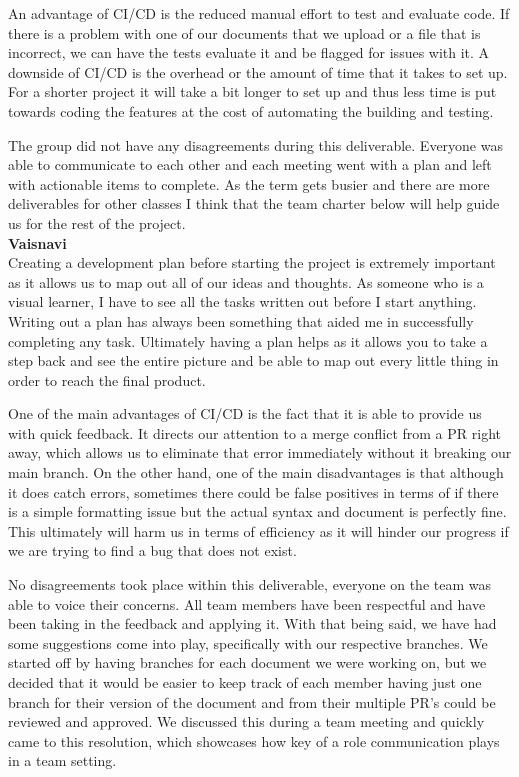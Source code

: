 \documentclass{article}
\begin{document}
An advantage of CI/CD is the reduced manual effort to test and evaluate code. If there is a problem with one of our documents that we upload or a file that is incorrect, we can have the tests evaluate it and be flagged for issues with it. A downside of CI/CD is the overhead or the amount of time that it takes to set up. For a shorter project it will take a bit longer to set up and thus less time is put towards coding the features at the cost of automating the building and testing.

The group did not have any disagreements during this deliverable. Everyone was able to communicate to each other and each meeting went with a plan and left with actionable items to complete. As the term gets busier and there are more deliverables for other classes I think that the team charter below will help guide us for the rest of the project. \\

\noindent \textbf{Vaisnavi} \\
Creating a development plan before starting the project is extremely important as it allows us to map out all of our ideas and thoughts. As someone who is a visual learner, I have to see all the tasks written out before I start anything. Writing out a plan has always been something that aided me in successfully completing any task. Ultimately having a plan helps as it allows you to take a step back and see the entire picture and be able to map out every little thing in order to reach the final product.


One of the main advantages of CI/CD is the fact that it is able to provide us with quick feedback. It directs our attention to a merge conflict from a PR right away, which allows us to eliminate that error immediately without it breaking our main branch. On the other hand, one of the main disadvantages is that although it does catch errors, sometimes there could be false positives in terms of if there is a simple formatting issue but the actual syntax and document is perfectly fine. This ultimately will harm us in terms of efficiency as it will hinder our progress if we are trying to find a bug that does not exist.


No disagreements took place within this deliverable, everyone on the team was able to voice their concerns. All team members have been respectful and have been taking in the feedback and applying it. With that being said, we have had some suggestions come into play, specifically with our respective branches. We started off by having branches for each document we were working on, but we decided that it would be easier to keep track of each member having just one branch for their version of the document and from their multiple PR’s could be reviewed and approved. We discussed this during a team meeting and quickly came to this resolution, which showcases how key of a role communication plays in a team setting.
\end{document}
